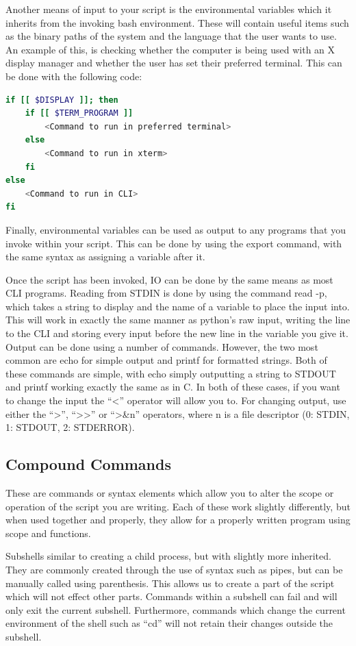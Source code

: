 \documentclass[a4paper,11pt]{report}
\begin{document}
			Another means of input to your script is the environmental variables which it inherits from the invoking bash environment. 
			These will contain useful items such as the binary paths of the system and the language that the user wants to use. 
			An example of this, is checking whether the computer is being used with an X display manager and whether the user has set their preferred terminal.  
			This can be done with the following code:
			\begin{lstlisting}[language=bash,numbers=none]
if [[ $DISPLAY ]]; then
	if [[ $TERM_PROGRAM ]]
		<Command to run in preferred terminal>
	else
		<Command to run in xterm>
	fi
else
	<Command to run in CLI>
fi
			\end{lstlisting}
			Finally, environmental variables can be used as output to any programs that you invoke within your script. 
			This can be done by using the export command, with the same syntax as assigning a variable after it. 
			
			Once the script has been invoked, IO can be done by the same means as most CLI programs. 
			Reading from STDIN is done by using the command read -p, which takes a string to display and the name of a variable to place the input into. 
			This will work in exactly the same manner as python's raw input, writing the line to the CLI and storing every input before the new line in the variable you give it. 
			Output can be done using a number of commands. 
			However, the two most common are echo for simple output and printf for formatted strings. 
			Both of these commands are simple, with echo simply outputting a string to STDOUT and printf working exactly the same as in C. 
			In both of these cases, if you want to change the input the ``<'' operator will allow you to. 
			For changing output, use either the ``>'', ``>{}>'' or ``>\&n'' operators, where n is a file descriptor (0: STDIN, 1: STDOUT, 2: STDERROR).
		\subsection{Compound Commands}
			These are commands or syntax elements which allow you to alter the scope or operation of the script you are writing. 
			Each of these work slightly differently, but when used together and properly, they allow for a properly written program using scope and functions. 

			Subshells similar to creating a child process, but with slightly more inherited. 
			They are commonly created through the use of syntax such as pipes, but can be manually called using parenthesis. 
			This allows us to create a part of the script which will not effect other parts. 
			Commands within a subshell can fail and will only exit the current subshell. 
			Furthermore, commands which change the current environment of the shell such as ``cd'' will not retain their changes outside the subshell. 
\end{document}
